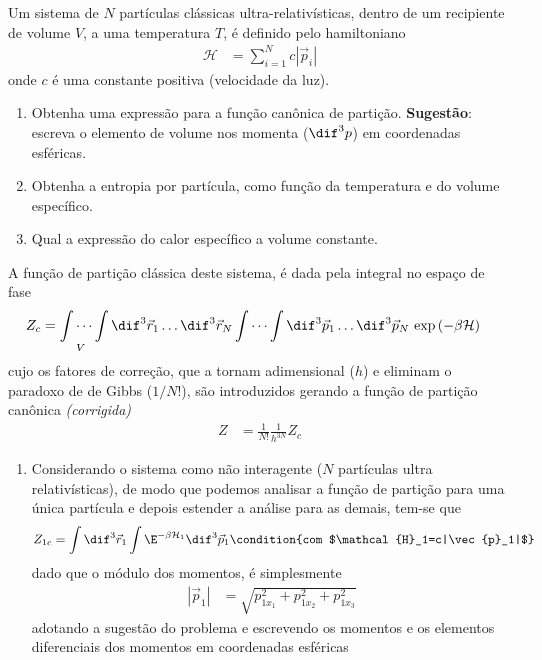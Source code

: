 \begin{prob}
  Um sistema de $N$ partículas clássicas ultra-relativísticas, dentro de um recipiente de volume $V$, a uma temperatura $T$, é definido pelo hamiltoniano
  \begin{align}
    \mathcal{H}&=\sum_{i=1}^Nc|\vec{p}_i|
  \end{align}
  onde $c$ é uma constante positiva (velocidade da luz).
  \begin{enumerate}[label=\alph *)]
    \item Obtenha uma expressão para a função canônica de partição. \textbf{Sugestão}: escreva o elemento de volume nos momenta ($\dif^3p$) em coordenadas esféricas.
    \item Obtenha a entropia por partícula, como função da temperatura e do volume específico.
    \item Qual a expressão do calor específico a volume constante.
  \end{enumerate}
  \begin{sol}
    A função de partição clássica deste sistema, é dada pela integral no espaço de fase
    \begin{align}
      Z_c&=\idotsint\limits_{V} \dif^3\vec{r}_1 \dots \dif^3\vec{r}_N \idotsint \dif^3\vec{p}_1 \dots \dif^3\vec{p}_N\,\exp\left(-\beta\mathcal{H}\right)
    \end{align}
    cujo os fatores de correção, que a tornam adimensional ($h$) e eliminam o paradoxo de de Gibbs ($1/N!$), são introduzidos gerando a função de partição canônica \emph{(corrigida)}
    \begin{align}
      Z&=\frac{1}{N!}\frac{1}{h^{3N}}Z_c
    \end{align}
    \begin{enumerate}[label=\alph *)]
      \item Considerando o sistema como não interagente ($N$ partículas ultra relativísticas), de modo que podemos analisar a função de partição para uma única partícula e depois estender a análise para as demais, tem-se que
      \begin{dmath*}
        Z_{1c}=\int \dif^3{\vec{r}_1}  \int \E^{-\beta\mathcal{H}_1} \dif^3{\vec{p}_1} \condition{com $\mathcal{H}_1=c|\vec{p}_1|$}
      \end{dmath*}
      dado que o módulo dos momentos, é simplesmente
      \begin{align}
        |\vec{p}_1|&=\sqrt{p_{1x_1}^2+p_{1x_2}^2+p_{1x_3}^2}
      \end{align}
      adotando a sugestão do problema e escrevendo os momentos e os elementos diferenciais dos momentos em coordenadas esféricas

\end{enumerate}
\end{sol}
\end{prob}
